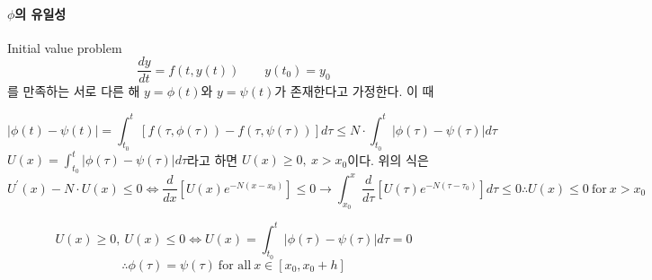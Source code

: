 \documentclass[a4paper,10pt]{article}
\begin{document}
\paragraph{$\phi$의 유일성}
Initial value problem
\begin{displaymath}
    \frac{dy}{dt} = f(t, y(t)) \qquad y(t_0) = y_0
\end{displaymath}
를 만족하는 서로 다른 해 $y = \phi(t)$와 $y = \psi(t)$가 존재한다고 가정한다. 이 때 %

\begin{displaymath}
    |\phi(t) - \psi(t)| = \int_{t_0}^{t} [ f(\tau, \phi(\tau)) - f(\tau, \psi(\tau))] d \tau \leq N \cdot \int_{t_0}^{t}|\phi(\tau) - \psi(\tau)| d\tau
\end{displaymath}
$\displaystyle{U(x) = \int_{t_0}^{t}|\phi(\tau) - \psi(\tau)| d\tau}$라고 하면 $U(x) \geq 0, \ x > x_0$이다.
위의 식은
\begin{displaymath}
    U^{\prime}(x) - N\cdot U(x) \leq 0 \iff \frac{d}{dx} \left[ U(x) e^{-N(x-x_0)}\right] \leq 0 \longrightarrow \int_{x_0}^{x} \frac{d}{d \tau} \left[ U(\tau) e^{-N(\tau-\tau_0)}\right] d \tau \leq 0
    \therefore U(x) \leq 0 \ \text{for} \ x > x_0
\end{displaymath}
 
\begin{displaymath}
    U(x) \geq 0, \ U(x) \leq 0 \iff U(x) = \int_{t_0}^{t}|\phi(\tau) - \psi(\tau)| d\tau = 0
\end{displaymath}
\begin{displaymath}
    \therefore
    \phi(\tau) = \psi(\tau) \ \text{for all} \ x \in [x_0, x_0 + h]
\end{displaymath}
\end{document}
